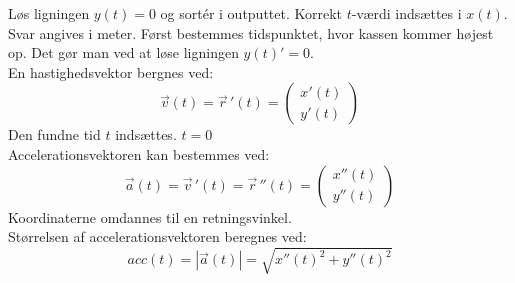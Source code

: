 \documentclass[../main.tex]{subfiles}
\begin{document}
\begin{tcolorbox}[title=Opgave 4,
    colback=blue!1!white,
    colframe=black,
    colbacktitle=blue!25!white,
    coltitle=red!25!black,
    fonttitle=\bfseries,
    subtitle style={boxrule=0.4pt,
    colback=blue!7!white} ]
        Løs ligningen \(y(t)=0\) og sortér i outputtet. Korrekt \(t\)-værdi indsættes i \(x(t)\).\\
        Svar angives i meter.
        Først bestemmes tidspunktet, hvor kassen kommer højest op. Det gør man ved at løse ligningen \(y(t)'=0\).\\
        En hastighedsvektor bergnes ved:
        \[\vec{v}(t)=\vec{r}\,'(t)=\begin{pmatrix} x'(t) \\ y'(t) \end{pmatrix}\]
        Den fundne tid \(t\) indsættes.
        \(t=0\)\\ 
        Accelerationsvektoren kan bestemmes ved:
        \[\vec{a}(t)=\vec{v}\,'(t) = \vec{r}\, '' (t)=\begin{pmatrix} x''(t) \\ y''(t) \end{pmatrix}\]
        Koordinaterne omdannes til en retningsvinkel.\\
        Størrelsen af accelerationsvektoren beregnes ved:
        \[acc(t)=|\vec{a}(t)|= \sqrt{x''(t)^2+y''(t)^2}\]
\end{tcolorbox}
\end{document}

